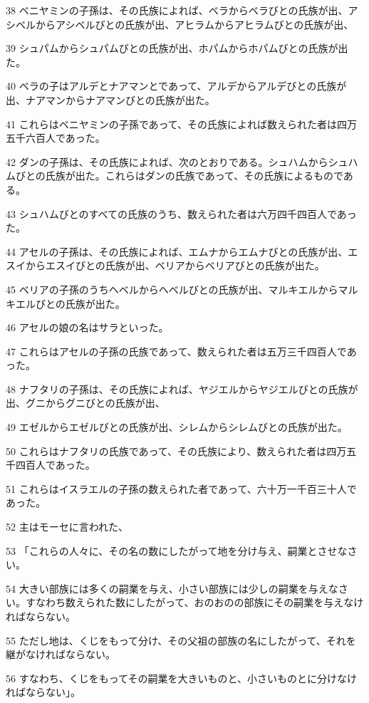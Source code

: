 \par 38 ベニヤミンの子孫は、その氏族によれば、ベラからベラびとの氏族が出、アシベルからアシベルびとの氏族が出、アヒラムからアヒラムびとの氏族が出、
\par 39 シュパムからシュパムびとの氏族が出、ホパムからホパムびとの氏族が出た。
\par 40 ベラの子はアルデとナアマンとであって、アルデからアルデびとの氏族が出、ナアマンからナアマンびとの氏族が出た。
\par 41 これらはベニヤミンの子孫であって、その氏族によれば数えられた者は四万五千六百人であった。
\par 42 ダンの子孫は、その氏族によれば、次のとおりである。シュハムからシュハムびとの氏族が出た。これらはダンの氏族であって、その氏族によるものである。
\par 43 シュハムびとのすべての氏族のうち、数えられた者は六万四千四百人であった。
\par 44 アセルの子孫は、その氏族によれば、エムナからエムナびとの氏族が出、エスイからエスイびとの氏族が出、ベリアからベリアびとの氏族が出た。
\par 45 ベリアの子孫のうちヘベルからヘベルびとの氏族が出、マルキエルからマルキエルびとの氏族が出た。
\par 46 アセルの娘の名はサラといった。
\par 47 これらはアセルの子孫の氏族であって、数えられた者は五万三千四百人であった。
\par 48 ナフタリの子孫は、その氏族によれば、ヤジエルからヤジエルびとの氏族が出、グニからグニびとの氏族が出、
\par 49 エゼルからエゼルびとの氏族が出、シレムからシレムびとの氏族が出た。
\par 50 これらはナフタリの氏族であって、その氏族により、数えられた者は四万五千四百人であった。
\par 51 これらはイスラエルの子孫の数えられた者であって、六十万一千百三十人であった。
\par 52 主はモーセに言われた、
\par 53 「これらの人々に、その名の数にしたがって地を分け与え、嗣業とさせなさい。
\par 54 大きい部族には多くの嗣業を与え、小さい部族には少しの嗣業を与えなさい。すなわち数えられた数にしたがって、おのおのの部族にその嗣業を与えなければならない。
\par 55 ただし地は、くじをもって分け、その父祖の部族の名にしたがって、それを継がなければならない。
\par 56 すなわち、くじをもってその嗣業を大きいものと、小さいものとに分けなければならない」。

